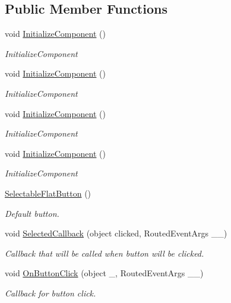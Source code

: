 \subsection*{Public Member Functions}
\begin{DoxyCompactItemize}
\item 
void \mbox{\hyperlink{class_wpf_handler_1_1_u_i_1_1_controls_1_1_selectable_flat_button_ab8dd666c08bc02e2c4677c7a780bb828}{Initialize\+Component}} ()
\begin{DoxyCompactList}\small\item\em Initialize\+Component \end{DoxyCompactList}\item 
void \mbox{\hyperlink{class_wpf_handler_1_1_u_i_1_1_controls_1_1_selectable_flat_button_ab8dd666c08bc02e2c4677c7a780bb828}{Initialize\+Component}} ()
\begin{DoxyCompactList}\small\item\em Initialize\+Component \end{DoxyCompactList}\item 
void \mbox{\hyperlink{class_wpf_handler_1_1_u_i_1_1_controls_1_1_selectable_flat_button_ab8dd666c08bc02e2c4677c7a780bb828}{Initialize\+Component}} ()
\begin{DoxyCompactList}\small\item\em Initialize\+Component \end{DoxyCompactList}\item 
void \mbox{\hyperlink{class_wpf_handler_1_1_u_i_1_1_controls_1_1_selectable_flat_button_ab8dd666c08bc02e2c4677c7a780bb828}{Initialize\+Component}} ()
\begin{DoxyCompactList}\small\item\em Initialize\+Component \end{DoxyCompactList}\item 
\mbox{\hyperlink{class_wpf_handler_1_1_u_i_1_1_controls_1_1_selectable_flat_button_a05bd4f4c7754212984b77499922a275d}{Selectable\+Flat\+Button}} ()
\begin{DoxyCompactList}\small\item\em Default button. \end{DoxyCompactList}\item 
void \mbox{\hyperlink{class_wpf_handler_1_1_u_i_1_1_controls_1_1_selectable_flat_button_a5cade89b74ec7a7f9566d0e63b677d27}{Selected\+Callback}} (object clicked, Routed\+Event\+Args \+\_\+\+\_\+)
\begin{DoxyCompactList}\small\item\em Callback that will be called when button will be clicked. \end{DoxyCompactList}\item 
void \mbox{\hyperlink{class_wpf_handler_1_1_u_i_1_1_controls_1_1_selectable_flat_button_ae01144a323df17892edbdd0f20a10ec7}{On\+Button\+Click}} (object \+\_\+, Routed\+Event\+Args \+\_\+\+\_\+)
\begin{DoxyCompactList}\small\item\em Callback for button click. \end{DoxyCompactList}\end{DoxyCompactItemize}
